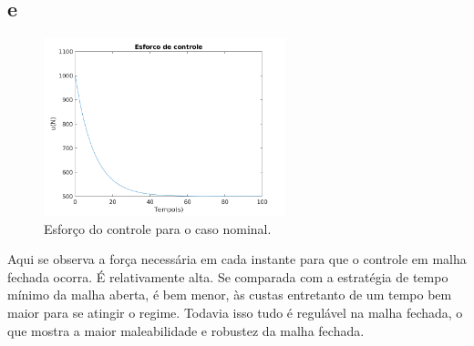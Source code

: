 \documentclass{article}[twocolumn]
\begin{document}
	\subsection{e}
	\begin{figure}[H]
		\centering
		\includegraphics[width=7cm]{3e.png}
		\caption{Esfor\c{c}o do controle para o caso nominal.}
	\end{figure}
	Aqui se observa a for\c{c}a necess\'aria em cada instante para que o controle em malha
	fechada ocorra. \'E relativamente alta. Se comparada com a estrat\'egia de tempo
	m\'inimo da malha aberta, \'e bem menor, \`as custas entretanto de um tempo bem maior
	para se atingir o regime. Todavia isso tudo \'e regul\'avel na malha fechada, o que mostra
	a maior maleabilidade e robustez da malha fechada.
\end{document}
